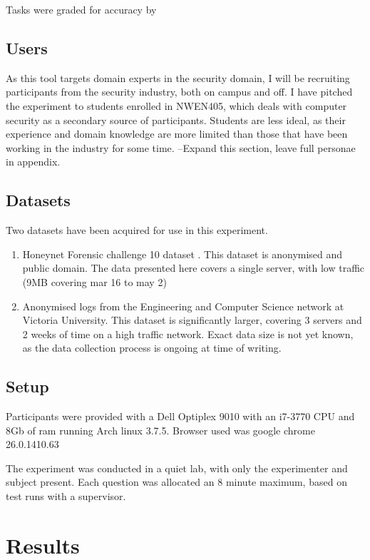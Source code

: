 Tasks were graded for accuracy by 

\subsection{Users}

As this tool targets domain experts in the security domain, I will be recruiting participants from the security industry, both on campus and off. I have pitched the experiment to students enrolled in NWEN405, which deals with computer security as a secondary source of participants. Students are less ideal, as their experience and domain knowledge are more limited than those that have been working in the industry for some time.
--Expand this section, leave full personae in appendix.

\subsection{Datasets}

Two datasets have been acquired for use in this experiment.
\begin{enumerate}
\item{Honeynet Forensic challenge 10 dataset \cite{forensic10}. This dataset is anonymised and public domain. The data presented here covers a single server, with low traffic (9MB covering mar 16 to may 2)}
\item{Anonymised logs from the Engineering and Computer Science network at Victoria University. This dataset is significantly larger, covering 3 servers and 2 weeks of time on a high traffic network. Exact data size is not yet known, as the data collection process is ongoing at time of writing.}
\end{enumerate}

\subsection{Setup}
Participants were provided with a Dell Optiplex 9010 with an i7-3770 CPU and 8Gb of ram running Arch linux 3.7.5.
Browser used was google chrome 26.0.1410.63

The experiment was conducted in a quiet lab, with only the experimenter and subject present. Each question was allocated an 8 minute maximum, based on test runs with a supervisor.

\section{Results}


